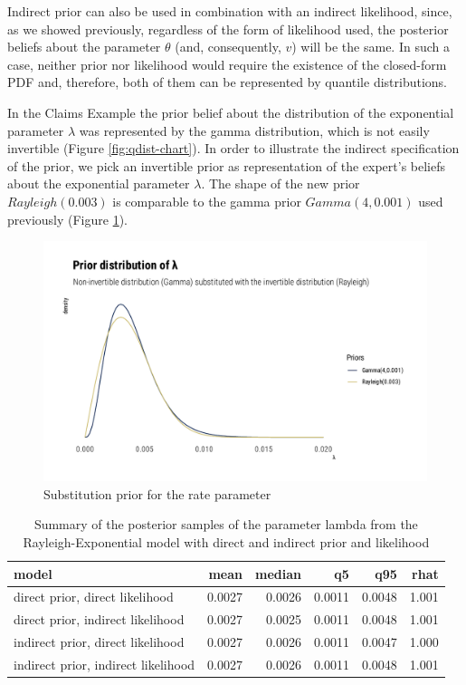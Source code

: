 \documentclass[
  12pt,
]{article}
\begin{document}
Indirect prior can also be used in combination with an indirect likelihood, since, as we showed previously, regardless of the form of likelihood used, the posterior beliefs about the parameter \(\theta\) (and, consequently, \(v\)) will be the same. In such a case, neither prior nor likelihood would require the existence of the closed-form PDF and, therefore, both of them can be represented by quantile distributions.

In the Claims Example the prior belief about the distribution of the exponential parameter \(\lambda\) was represented by the gamma distribution, which is not easily invertible (Figure \ref{fig:qdist-chart}). In order to illustrate the indirect specification of the prior, we pick an invertible prior as representation of the expert's beliefs about the exponential parameter \(\lambda\). The shape of the new prior \(Rayleigh(0.003)\) is comparable to the gamma prior \(Gamma(4,0.001)\) used previously (Figure \ref{fig:gamma-ray-prior-graph}).

\begin{figure}

{\centering \includegraphics[width=0.8\linewidth]{ilbm_article_files/figure-latex/gamma-ray-prior-graph-1} 

}

\caption{Substitution prior for the rate parameter}\label{fig:gamma-ray-prior-graph}
\end{figure}

\begin{table}[!h]

\caption{\label{tab:rexp-prior-lik-tab}Summary of the posterior samples of the parameter lambda from the Rayleigh-Exponential model with direct and indirect prior and likelihood}
\centering
\begin{tabular}[t]{lrrrrr}
\toprule
model & mean & median & q5 & q95 & rhat\\
\midrule
direct prior, direct likelihood & 0.0027 & 0.0026 & 0.0011 & 0.0048 & 1.001\\
direct prior, indirect likelihood & 0.0027 & 0.0025 & 0.0011 & 0.0048 & 1.001\\
indirect prior, direct likelihood & 0.0027 & 0.0026 & 0.0011 & 0.0047 & 1.000\\
indirect prior, indirect likelihood & 0.0027 & 0.0026 & 0.0011 & 0.0048 & 1.001\\
\bottomrule
\end{tabular}
\end{table}
\end{document}
